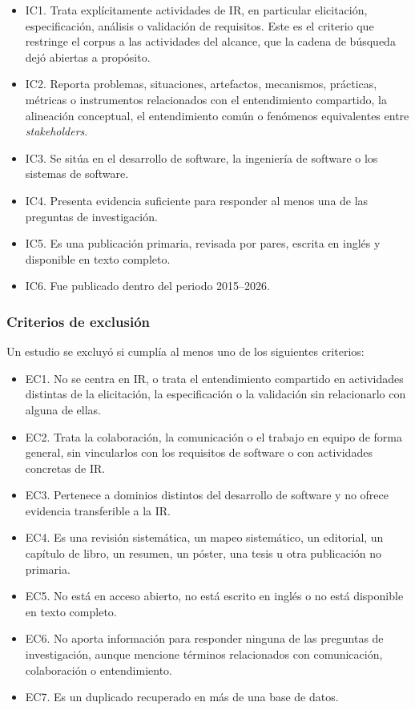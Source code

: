 \documentclass[12pt,letterpaper,oneside]{report}
\begin{document}
\begin{itemize}
  \item IC1. Trata explícitamente actividades de IR, en particular
        elicitación, especificación, análisis o validación de requisitos. Este
        es el criterio que restringe el corpus a las actividades del alcance,
        que la cadena de búsqueda dejó abiertas a propósito.
  \item IC2. Reporta problemas, situaciones, artefactos, mecanismos,
        prácticas, métricas o instrumentos relacionados con el entendimiento
        compartido, la alineación conceptual, el entendimiento común o
        fenómenos equivalentes entre \textit{stakeholders}.
  \item IC3. Se sitúa en el desarrollo de software, la ingeniería de
        software o los sistemas de software.
  \item IC4. Presenta evidencia suficiente para responder al menos una de
        las preguntas de investigación.
  \item IC5. Es una publicación primaria, revisada por pares, escrita en
        inglés y disponible en texto completo.
  \item IC6. Fue publicado dentro del periodo 2015--2026.
\end{itemize}

\subsubsection{Criterios de exclusión}
Un estudio se excluyó si cumplía al menos uno de los siguientes criterios:

\begin{itemize}
  \item EC1. No se centra en IR, o trata el entendimiento compartido en
        actividades distintas de la elicitación, la especificación o la
        validación sin relacionarlo con alguna de ellas.
  \item EC2. Trata la colaboración, la comunicación o el trabajo en equipo
        de forma general, sin vincularlos con los requisitos de software o con
        actividades concretas de IR.
  \item EC3. Pertenece a dominios distintos del desarrollo de software y no
        ofrece evidencia transferible a la IR.
  \item EC4. Es una revisión sistemática, un mapeo sistemático, un
        editorial, un capítulo de libro, un resumen, un póster, una tesis u
        otra publicación no primaria.
  \item EC5. No está en acceso abierto, no está escrito en inglés o no está
        disponible en texto completo.
  \item EC6. No aporta información para responder ninguna de las preguntas
        de investigación, aunque mencione términos relacionados con
        comunicación, colaboración o entendimiento.
  \item EC7. Es un duplicado recuperado en más de una base de datos.
\end{itemize}
\end{document}
